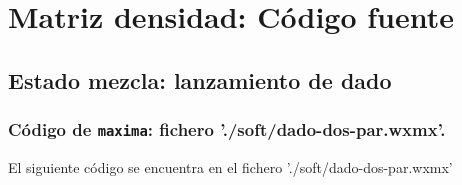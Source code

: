 %

\chapter{Matriz densidad: Código fuente}
\label{chapt:apcua-matriz-densidad-codigo}

\section{Estado mezcla: lanzamiento de dado}
\label{sect:apcua-estadomezcla-dado}

\subsection{Código de \texttt{maxima}:
  fichero './soft/dado-dos-par.wxmx'.}
\label{subsect:apcua-estadomezcla-dado-maxima}

El siguiente código se encuentra en el fichero './soft/dado-dos-par.wxmx'
%
%     
%   
% 
% 
% 

